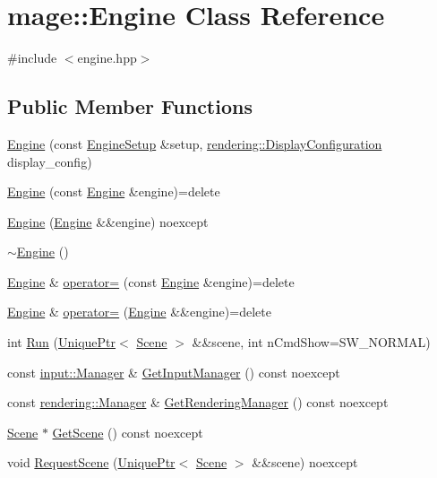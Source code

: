 \hypertarget{classmage_1_1_engine}{}\section{mage\+:\+:Engine Class Reference}
\label{classmage_1_1_engine}


{\ttfamily \#include $<$engine.\+hpp$>$}

\subsection*{Public Member Functions}
\begin{DoxyCompactItemize}
\item 
\hyperlink{classmage_1_1_engine_a0bc870c6e4f9418bcce548aa5ef6626b}{Engine} (const \hyperlink{classmage_1_1_engine_setup}{Engine\+Setup} \&setup, \hyperlink{classmage_1_1rendering_1_1_display_configuration}{rendering\+::\+Display\+Configuration} display\+\_\+config)
\item 
\hyperlink{classmage_1_1_engine_afd2f4f32b2e803f59521aafe1924f0ba}{Engine} (const \hyperlink{classmage_1_1_engine}{Engine} \&engine)=delete
\item 
\hyperlink{classmage_1_1_engine_a91a51a60109b49d6e322c299147e1312}{Engine} (\hyperlink{classmage_1_1_engine}{Engine} \&\&engine) noexcept
\item 
\hyperlink{classmage_1_1_engine_a34628556f8397d70ed018d71e343c2f5}{$\sim$\+Engine} ()
\item 
\hyperlink{classmage_1_1_engine}{Engine} \& \hyperlink{classmage_1_1_engine_a1eedff82d4c8207c61676230520648fd}{operator=} (const \hyperlink{classmage_1_1_engine}{Engine} \&engine)=delete
\item 
\hyperlink{classmage_1_1_engine}{Engine} \& \hyperlink{classmage_1_1_engine_a22607a263e0be5e179cc0e4bf13b18f7}{operator=} (\hyperlink{classmage_1_1_engine}{Engine} \&\&engine)=delete
\item 
int \hyperlink{classmage_1_1_engine_a4ad554bca1ac892e1274f2e707c2a017}{Run} (\hyperlink{namespacemage_a3316d7143a973e37adf1110f2e80ca31}{Unique\+Ptr}$<$ \hyperlink{classmage_1_1_scene}{Scene} $>$ \&\&scene, int n\+Cmd\+Show=S\+W\+\_\+\+N\+O\+R\+M\+AL)
\item 
const \hyperlink{classmage_1_1input_1_1_manager}{input\+::\+Manager} \& \hyperlink{classmage_1_1_engine_ae5b542540511190eb6d284bf3e6ab54c}{Get\+Input\+Manager} () const noexcept
\item 
const \hyperlink{classmage_1_1rendering_1_1_manager}{rendering\+::\+Manager} \& \hyperlink{classmage_1_1_engine_a9386c3aff5d7580ea39202e4dae967de}{Get\+Rendering\+Manager} () const noexcept
\item 
\hyperlink{classmage_1_1_scene}{Scene} $\ast$ \hyperlink{classmage_1_1_engine_ac76b2061f2b5b9089a6b2387a40dbf73}{Get\+Scene} () const noexcept
\item 
void \hyperlink{classmage_1_1_engine_a0999f6eb6b09ad015103a46509b333b8}{Request\+Scene} (\hyperlink{namespacemage_a3316d7143a973e37adf1110f2e80ca31}{Unique\+Ptr}$<$ \hyperlink{classmage_1_1_scene}{Scene} $>$ \&\&scene) noexcept
\end{DoxyCompactItemize}
